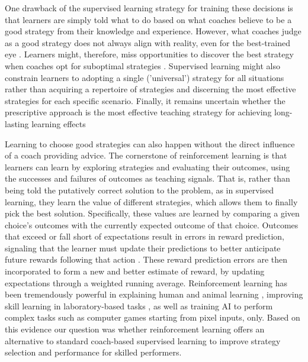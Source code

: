 \documentclass[pdflatex,sn-mathphys-num]{sn-jnl}%
\theoremstyle{thmstyleone}%
\theoremstyle{thmstyletwo}%
\theoremstyle{thmstylethree}%
\begin{document}
One drawback of the supervised learning strategy for training these decisions is that learners are simply told what to do based on what coaches believe to be a good strategy from their knowledge and experience. However, what coaches judge as a good strategy does not always align with reality, even for the best-trained eye \cite{supej_impact_2019, cochrum_visual_2021}. Learners might, therefore, miss opportunities to discover the best strategy when coaches opt for suboptimal strategies \cite{gray_plateaus_2017}. Supervised learning might also constrain learners to adopting a single ('universal') strategy for all situations rather than acquiring a repertoire of strategies and discerning the most effective strategies for each specific scenario. Finally, it remains uncertain whether the prescriptive approach is the most effective teaching strategy for achieving long-lasting learning effects \cite{wulf_instructions_1997, hodges_role_1999, williams_practice_2005,williams_effective_2023} 

Learning to choose good strategies can also happen without the direct influence of a coach providing advice. The cornerstone of reinforcement learning \cite{sutton_reinforcement_2018} is that learners can learn by exploring strategies and evaluating their outcomes, using the successes and failures of outcomes as teaching signals. That is, rather than being told the putatively correct solution to the problem, as in supervised learning, they learn the value of different strategies, which allows them to finally pick the best solution. Specifically, these values are learned by comparing a given choice's outcomes with the currently expected outcome of that choice. Outcomes that exceed or fall short of expectations result in errors in reward prediction, signaling that the learner must update their predictions to better anticipate future rewards following that action \cite{rescorla_theory_1972}. These reward prediction errors are then incorporated to form a new and better estimate of reward, by updating expectations through a weighted running average. Reinforcement learning has been tremendously powerful in explaining human and animal learning \cite{waelti_dopamine_2001, schultz_neural_1997, pessiglione_dopamine-dependent_2006}, improving skill learning in laboratory-based tasks \cite{lior_shmuelof_overcoming_2012, abe_reward_2011, truong_error-based_2023, hasson_reinforcement_2015}, as well as training AI to perform complex tasks such as computer games starting from pixel inputs, only\cite{mnih_human-level_2015}. Based on this evidence our question was whether reinforcement learning offers an alternative to standard coach-based supervised learning to improve strategy selection and performance for skilled performers.
\end{document}
